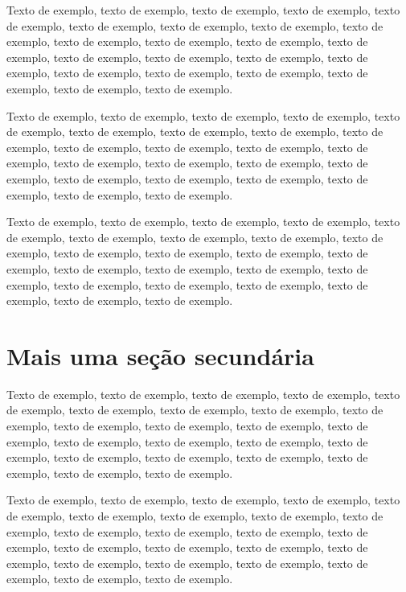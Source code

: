 \documentclass[
	12pt,				%
	oneside,			%
	a4paper,			%
	english,			%
	brazil				%
	]{abntex2ppgsi}
\begin{document}
Texto de exemplo, texto de exemplo, texto de exemplo, texto de exemplo, texto de exemplo, texto de exemplo, texto de exemplo, texto de exemplo, texto de exemplo, texto de exemplo, texto de exemplo, texto de exemplo, texto de exemplo, texto de exemplo, texto de exemplo, texto de exemplo, texto de exemplo, texto de exemplo, texto de exemplo, texto de exemplo, texto de exemplo, texto de exemplo, texto de exemplo.

Texto de exemplo, texto de exemplo, texto de exemplo, texto de exemplo, texto de exemplo, texto de exemplo, texto de exemplo, texto de exemplo, texto de exemplo, texto de exemplo, texto de exemplo, texto de exemplo, texto de exemplo, texto de exemplo, texto de exemplo, texto de exemplo, texto de exemplo, texto de exemplo, texto de exemplo, texto de exemplo, texto de exemplo, texto de exemplo, texto de exemplo.

Texto de exemplo, texto de exemplo, texto de exemplo, texto de exemplo, texto de exemplo, texto de exemplo, texto de exemplo, texto de exemplo, texto de exemplo, texto de exemplo, texto de exemplo, texto de exemplo, texto de exemplo, texto de exemplo, texto de exemplo, texto de exemplo, texto de exemplo, texto de exemplo, texto de exemplo, texto de exemplo, texto de exemplo, texto de exemplo, texto de exemplo.

\section{Mais uma seção secundária}

Texto de exemplo, texto de exemplo, texto de exemplo, texto de exemplo, texto de exemplo, texto de exemplo, texto de exemplo, texto de exemplo, texto de exemplo, texto de exemplo, texto de exemplo, texto de exemplo, texto de exemplo, texto de exemplo, texto de exemplo, texto de exemplo, texto de exemplo, texto de exemplo, texto de exemplo, texto de exemplo, texto de exemplo, texto de exemplo, texto de exemplo.

Texto de exemplo, texto de exemplo, texto de exemplo, texto de exemplo, texto de exemplo, texto de exemplo, texto de exemplo, texto de exemplo, texto de exemplo, texto de exemplo, texto de exemplo, texto de exemplo, texto de exemplo, texto de exemplo, texto de exemplo, texto de exemplo, texto de exemplo, texto de exemplo, texto de exemplo, texto de exemplo, texto de exemplo, texto de exemplo, texto de exemplo.

\postextual
\end{document}
